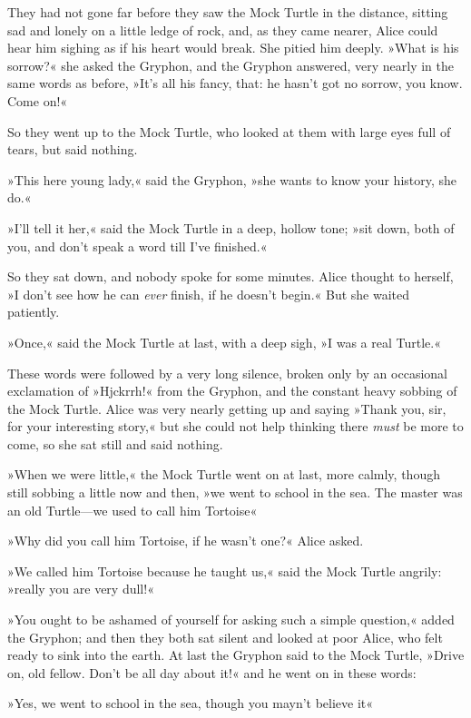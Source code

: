 They had not gone far before they saw the Mock Turtle in the distance, sitting sad and lonely on a little ledge of rock, and, as they came nearer, Alice could hear him sighing as if his heart would break. She pitied him deeply. »What is his sorrow?« she asked the Gryphon, and the Gryphon answered, very nearly in the same words as before, »It's all his fancy, that: he hasn't got no sorrow, you know. Come on!«

So they went up to the Mock Turtle, who looked at them with large eyes full of tears, but said nothing.

»This here young lady,« said the Gryphon, »she wants to know your history, she do.«

»I'll tell it her,« said the Mock Turtle in a deep, hollow tone; »sit down, both of you, and don't speak a word till I've finished.«

So they sat down, and nobody spoke for some minutes. Alice thought to herself, »I don't see how he can \textit{ever} finish, if he doesn't begin.« But she waited patiently.

»Once,« said the Mock Turtle at last, with a deep sigh, »I was a real Turtle.«

These words were followed by a very long silence, broken only by an occasional exclamation of »Hjckrrh!« from the Gryphon, and the constant heavy sobbing of the Mock Turtle. Alice was very nearly getting up and saying »Thank you, sir, for your interesting story,« but she could not help thinking there \textit{must} be more to come, so she sat still and said nothing.

»When we were little,« the Mock Turtle went on at last, more calmly, though still sobbing a little now and then, »we went to school in the sea. The master was an old Turtle—we used to call him Tortoise\longdash«

»Why did you call him Tortoise, if he wasn't one?« Alice asked.

»We called him Tortoise because he taught us,« said the Mock Turtle angrily: »really you are very dull!«

»You ought to be ashamed of yourself for asking such a simple question,« added the Gryphon; and then they both sat silent and looked at poor Alice, who felt ready to sink into the earth. At last the Gryphon said to the Mock Turtle, »Drive on, old fellow. Don't be all day about it!« and he went on in these words:

»Yes, we went to school in the sea, though you mayn't believe it\longdash«

